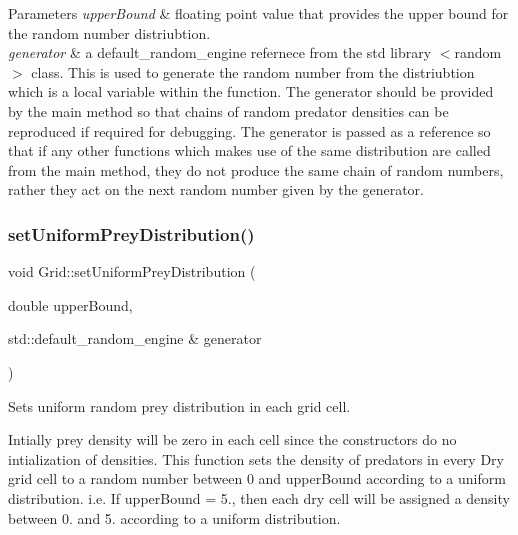\begin{DoxyParams}{Parameters}
{\em upper\+Bound} & floating point value that provides the upper bound for the random number distriubtion.\\
\hline
{\em generator} & a default\+\_\+random\+\_\+engine refernece from the std library $<$random$>$ class. This is used to generate the random number from the distriubtion which is a local variable within the function. The generator should be provided by the main method so that chains of random predator densities can be reproduced if required for debugging. The generator is passed as a reference so that if any other functions which makes use of the same distribution are called from the main method, they do not produce the same chain of random numbers, rather they act on the next random number given by the generator. \\
\hline
\end{DoxyParams}
\mbox{\label{class_grid_a2f366ddaaa75475a9597f9a85ab24d59}} 
\subsubsection{\texorpdfstring{set\+Uniform\+Prey\+Distribution()}{setUniformPreyDistribution()}}
{\footnotesize\ttfamily void Grid\+::set\+Uniform\+Prey\+Distribution (\begin{DoxyParamCaption}\item[{double}]{upper\+Bound,  }\item[{std\+::default\+\_\+random\+\_\+engine \&}]{generator }\end{DoxyParamCaption})}

Sets uniform random prey distribution in each grid cell.

Intially prey density will be zero in each cell since the constructors do no intialization of densities. This function sets the density of predators in every Dry grid cell to a random number between 0 and upper\+Bound according to a uniform distribution. i.\+e. If upper\+Bound = 5., then each dry cell will be assigned a density between 0. and 5. according to a uniform distribution.


